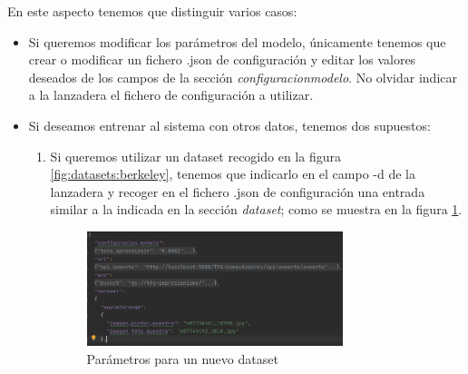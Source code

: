 \documentclass[../main.tex]{subfiles}
\begin{document}
En este aspecto tenemos que distinguir varios casos:

\begin{itemize}
    \item Si queremos modificar los parámetros del modelo, únicamente tenemos que crear o modificar un fichero .json de configuración y editar los valores deseados de los campos de la sección \textit{configuracion\textunderscore modelo}. No olvidar indicar a la lanzadera el fichero de configuración a utilizar.
    \item Si deseamos entrenar al sistema con otros datos, tenemos dos supuestos: 
    
    \begin{enumerate}
        \item Si queremos utilizar un dataset recogido en la figura \ref{fig:datasets:berkeley}, tenemos que indicarlo en el campo -d de la lanzadera y recoger en el fichero .json de configuración una entrada similar a la indicada en la sección \textit{dataset}; como se muestra en la figura \ref{fig:parametros_dataset_berkeley}. 
        
            \begin{figure}[h!]
            \centering
            \includegraphics[width=0.75\textwidth]{imagenes/parametros_nuevo_dataset_berkeley.png}
            \caption{Parámetros para un nuevo dataset}
            \label{fig:parametros_dataset_berkeley}
            \end{figure}
        

\end{enumerate}
\end{itemize}
\end{document}
